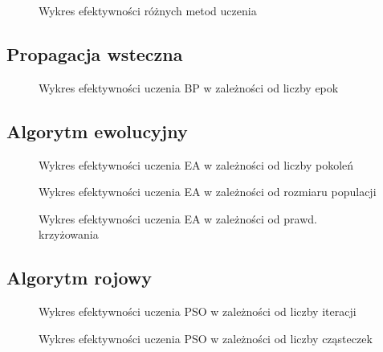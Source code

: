 \documentclass[11pt,a4paper,oneside]{report}
\begin{document}
\begin{figure}[H]
	\caption{Wykres efektywności różnych metod uczenia \label{figure:compare}}
	
\end{figure}

\subsection{Propagacja wsteczna}

\begin{figure}[H]
	\caption{Wykres efektywności uczenia BP w zależności od liczby epok \label{figure:bp_epochs}}
	
\end{figure}

\subsection{Algorytm ewolucyjny}

\begin{figure}[H]
	\caption{Wykres efektywności uczenia EA w zależności od liczby pokoleń \label{figure:ea_generations}}
	
\end{figure}

\begin{figure}[H]
	\caption{Wykres efektywności uczenia EA w zależności od rozmiaru populacji \label{figure:ea_population}}
	
\end{figure}

\begin{figure}[H]
	\caption{Wykres efektywności uczenia EA w zależności od prawd. krzyżowania \label{figure:ea_cp}}
	
\end{figure}

\subsection{Algorytm rojowy}

\begin{figure}[H]
	\caption{Wykres efektywności uczenia PSO w zależności od liczby iteracji \label{figure:pso_generations}}
	
\end{figure}

\begin{figure}[H]
	\caption{Wykres efektywności uczenia PSO w zależności od liczby cząsteczek \label{figure:pso_population}}
	
\end{figure}
\end{document}
